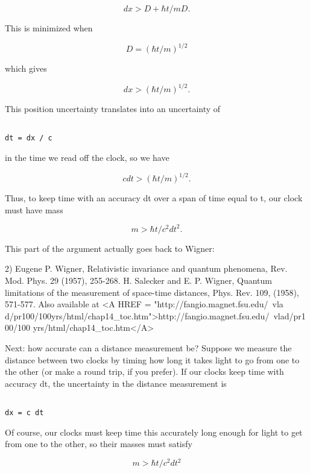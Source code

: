 $$

dx > D + \hbar  t/mD.  
$$
    
This is minimized when 


$$

D = (\hbar  t/m)^{1/2}
$$
    
which gives 


$$

dx > (\hbar  t/m)^{1/2}.
$$
    
This position uncertainty translates into an uncertainty of


\begin{verbatim}

dt = dx / c
\end{verbatim}
    
in the time we read off the clock, so we have 


$$

c dt > (\hbar  t/m)^{1/2}.
$$
    
Thus, to keep time with an accuracy dt over a span of time
equal to t, our clock must have mass


$$

m > \hbar  t / c^{2} dt^{2}.
$$
    
This part of the argument actually goes back to Wigner:

2) 
Eugene P. Wigner, Relativistic invariance and
quantum phenomena, Rev. Mod. Phys. 29
(1957), 255-268.
H. Salecker and E. P. Wigner, Quantum limitations of
the measurement of space-time distances, Phys. Rev. 109,
(1958), 571-577.  Also available at <A HREF = "http://fangio.magnet.fsu.edu/~vla
d/pr100/100yrs/html/chap14_toc.htm">http://fangio.magnet.fsu.edu/~vlad/pr100/100
yrs/html/chap14_toc.htm</A>

Next: how accurate can a distance measurement be?  Suppose we measure
the distance between two clocks by timing how long it takes light to
go from one to the other (or make a round trip, if you prefer).  If
our clocks keep time with accuracy dt, the uncertainty in the distance
measurement is


\begin{verbatim}

dx = c dt
\end{verbatim}
    
Of course, our clocks must keep time this accurately long enough for
light to get from one to the other, so their masses must satisfy


$$

m > \hbar  t / c^{2} dt^{2}
$$
    
